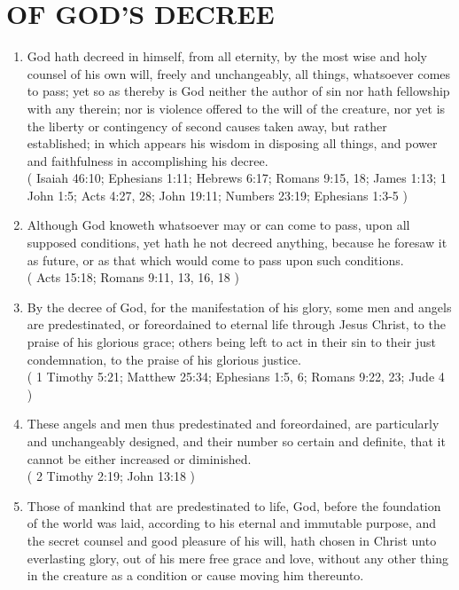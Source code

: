 \documentclass[12pt,a4paper]{book}
\begin{document}
\chapter{OF GOD'S DECREE}
\label{ch-dec}
\begin{enumerate}
\item
\label{ch-dec-1}
God hath decreed in himself, from all eternity, by the most wise and holy counsel of his own will, freely and unchangeably, all things, whatsoever comes to pass; yet so as thereby is God neither the author of sin nor hath fellowship with any therein; nor is violence offered to the will of the creature, nor yet is the liberty or contingency of second causes taken away, but rather established; in which appears his wisdom in disposing all things, and power and faithfulness in accomplishing his decree.\\
( Isaiah 46:10; Ephesians 1:11; Hebrews 6:17; Romans 9:15, 18; James 1:13; 1 John 1:5; Acts 4:27, 28; John 19:11; Numbers 23:19; Ephesians 1:3-5 )
\item
\label{ch-dec-2}
Although God knoweth whatsoever may or can come to pass, upon all supposed conditions, yet hath he not decreed anything, because he foresaw it as future, or as that which would come to pass upon such conditions.\\
( Acts 15:18; Romans 9:11, 13, 16, 18 )
\item
\label{ch-dec-3}
By the decree of God, for the manifestation of his glory, some men and angels are predestinated, or foreordained to eternal life through Jesus Christ, to the praise of his glorious grace; others being left to act in their sin to their just condemnation, to the praise of his glorious justice.\\
( 1 Timothy 5:21; Matthew 25:34; Ephesians 1:5, 6; Romans 9:22, 23; Jude 4 )
\item
\label{ch-dec-4}
These angels and men thus predestinated and foreordained, are particularly and unchangeably designed, and their number so certain and definite, that it cannot be either increased or diminished.\\
( 2 Timothy 2:19; John 13:18 )
\item
\label{ch-dec-5}
Those of mankind that are predestinated to life, God, before the foundation of the world was laid, according to his eternal and immutable purpose, and the secret counsel and good pleasure of his will, hath chosen in Christ unto everlasting glory, out of his mere free grace and love, without any other thing in the creature as a condition or cause moving him thereunto.\\

\end{enumerate}
\end{document}
